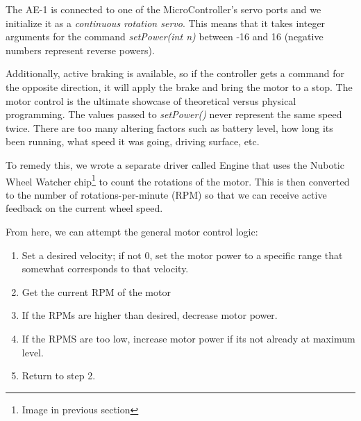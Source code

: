 \documentclass[12pt]{article}
\begin{document}
\begin{figure}[h]
\centering
{}
\hspace{5mm}
\end{figure}

The AE-1 is connected to one of the MicroController's servo ports and we initialize it as a \textit{continuous rotation servo}.  This means that it takes integer arguments for the command \textit{setPower(int n)} between -16 and 16 (negative numbers represent reverse powers).  

Additionally, active braking is available, so if the controller gets a command for the opposite direction, it will apply the brake and bring the motor to a stop.
\vspace{2mm}
The motor control is the ultimate showcase of theoretical versus physical programming.  The values passed to \textit{setPower()} never represent the same speed twice.  There are too many altering factors such as battery level, how long its been running, what speed it was going, driving surface, etc.

To remedy this, we wrote a separate driver called Engine that uses the Nubotic Wheel Watcher chip\footnote{Image in previous section} to count the rotations of the motor.  This is then converted to the number of rotations-per-minute (RPM) so that we can receive active feedback on the current wheel speed.

From here, we can attempt the general motor control logic:
\begin{enumerate}
\item Set a desired velocity; if not 0, set the motor power to a specific range that somewhat corresponds to that velocity.
\item Get the current RPM of the motor
\item If the RPMs are  higher than desired, decrease motor power.
\item If the RPMS are too low, increase motor power if its not already at maximum level.
\item Return to step 2.
\end{enumerate}
\end{document}
